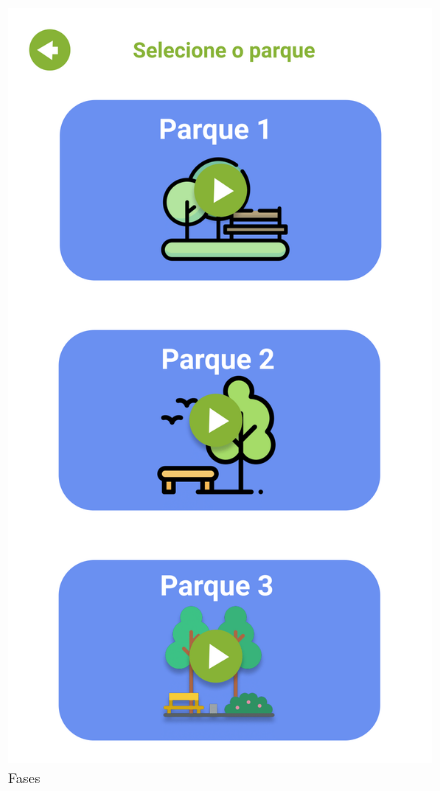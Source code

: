 \documentclass[]{scrartcl}
\begin{document}
\begin{figure}[H]
	\begin{center}
		\includegraphics[scale=0.3]{figs/Game Design-05.png}
		\caption{Fases}
	\end{center}
\end{figure}
\end{document}
